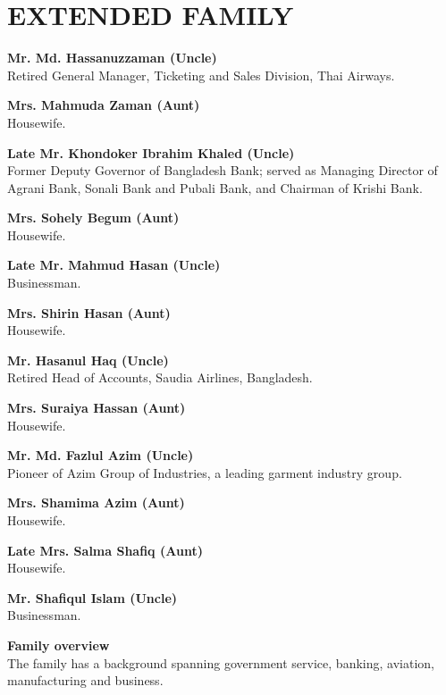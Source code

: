 \documentclass[10pt,a4paper]{article}
\newcommand{\member}[2]{{\color{navy}\bfseries #1}\\[0.1em]{\small #2}\par\vspace{0.3em}}
\begin{document}
\section*{EXTENDED FAMILY}
\member{Mr. Md. Hassanuzzaman (Uncle)}{Retired General Manager, Ticketing and Sales Division, Thai Airways.}
\member{Mrs. Mahmuda Zaman (Aunt)}{Housewife.}
\member{Late Mr. Khondoker Ibrahim Khaled (Uncle)}{Former Deputy Governor of Bangladesh Bank; served as Managing Director of Agrani Bank, Sonali Bank and Pubali Bank, and Chairman of Krishi Bank.}
\member{Mrs. Sohely Begum (Aunt)}{Housewife.}
\member{Late Mr. Mahmud Hasan (Uncle)}{Businessman.}
\member{Mrs. Shirin Hasan (Aunt)}{Housewife.}
\member{Mr. Hasanul Haq (Uncle)}{Retired Head of Accounts, Saudia Airlines, Bangladesh.}
\member{Mrs. Suraiya Hassan (Aunt)}{Housewife.}
\member{Mr. Md. Fazlul Azim (Uncle)}{Pioneer of Azim Group of Industries, a leading garment industry group.}
\member{Mrs. Shamima Azim (Aunt)}{Housewife.}
\member{Late Mrs. Salma Shafiq (Aunt)}{Housewife.}
\member{Mr. Shafiqul Islam (Uncle)}{Businessman.}

\vspace{0.6em}
\begin{tcolorbox}[colback=panel,colframe=line,boxrule=0.5pt,arc=1.5pt,left=8pt,right=8pt,top=6pt,bottom=6pt]
{\color{navy}\bfseries\small Family overview}\\[0.15em]
{\small The family has a background spanning government service, banking, aviation, manufacturing and business.}
\end{tcolorbox}
\end{document}
